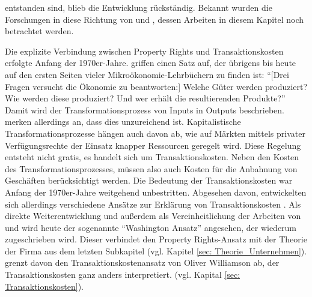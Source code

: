 entstanden sind, blieb die Entwicklung rückständig. Bekannt wurden die Forschungen in diese Richtung von \textcite{Soto2000} und \textcite{Acemoglu2012}, dessen Arbeiten in diesem Kapitel noch betrachtet werden.

Die explizite Verbindung zwischen Property Rights und Transaktionskosten erfolgte Anfang der 1970er-Jahre. \textcite{Alchian1973} griffen einen Satz auf, der übrigens bis heute auf den ersten Seiten vieler Mikroökonomie-Lehrbüchern zu finden ist: "`[Drei Fragen versucht die Ökonomie zu beantworten:] Welche Güter werden produziert? Wie werden diese produziert? Und wer erhält die resultierenden Produkte?"' Damit wird der Transformationsprozess von Inputs in Outputs beschrieben. \textcite[S. 16]{Alchian1973} merken allerdings an, dass dies unzureichend ist. Kapitalistische Transformationsprozesse hängen auch davon ab, wie auf Märkten mittels privater Verfügungsrechte der Einsatz knapper Ressourcen geregelt wird. Diese Regelung entsteht nicht gratis, es handelt sich um Transaktionskosten. Neben den Kosten des Transformationsprozesses, müssen also auch Kosten für die Anbahnung von Geschäften berücksichtigt werden. Die Bedeutung der Transaktionskosten war Anfang der 1970er-Jahre weitgehend unbestritten. Abgesehen davon, entwickelten sich allerdings verschiedene Ansätze zur Erklärung von Transaktionskosten \parencite[S. 33]{North1990}. Als direkte Weiterentwicklung und außerdem als Vereinheitlichung \parencite{Allen2022} der Arbeiten von \textcite{Coase1960} und \textcite{Alchian1965, Demsetz1967, Alchian1973} wird heute der sogenannte "`Washington Ansatz"' angesehen, der wiederum \textcite{Cheung1974, Cheung1983} zugeschrieben wird. Dieser verbindet den Property Rights-Ansatz mit der Theorie der Firma aus dem letzten Subkapitel (vgl. Kapitel \ref{sec: Theorie_Unternehmen}). \textcite{North1990} grenzt davon den Transaktionskostenansatz von Oliver Williamson ab, der Transaktionskosten ganz anders interpretiert. (vgl. Kapital \ref{sec: Transaktionskosten}). 

